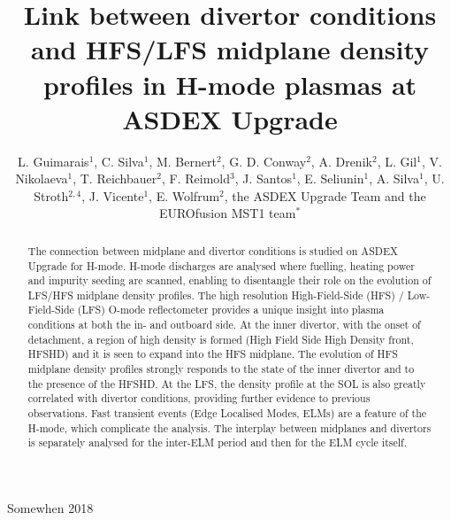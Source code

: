 \documentclass[12pt]{iopart}
\begin{document}
\title[Link between divertor conditions and HFS/LFS midplane density profiles in H-mode plasmas at ASDEX Upgrade]{Link between divertor conditions and HFS/LFS midplane density profiles in H-mode plasmas at ASDEX Upgrade}
\author{L. Guimarais$^1$, C. Silva$^1$, M. Bernert$^2$, G. D. Conway$^2$, A. Drenik$^2$, L. Gil$^1$, V. Nikolaeva$^{1}$, T. Reichbauer$^2$, F. Reimold$^3$, J. Santos$^1$, E. Seliunin$^1$, A. Silva$^1$, U. Stroth$^{2,4}$, J. Vicente$^1$, E. Wolfrum$^2$, the ASDEX Upgrade Team and the EUROfusion MST1 team$^*$}

\address{$^1$ Instituto de Plasmas e Fus\~ao Nuclear, Instituto Superior T\'ecnico, Universidade de Lisboa, Portugal}
\address{$^2$ Max-Planck-Institut f\"ur Plasmaphysik, Boltzmannstr. 2, 85748, Garching, Germany}
\address{$^3$ Forschungszentrum J\"ulich GmbH, Wilhelm-Johnen-Stra{\ss}e, 52425 J\"ulich, Germany}
\address{Physik-Department E28, Technische Universit\"at M\"unchen, James-Franck-Str. 1, 85748 Garching, Germany}
\begin{center}
\address{$^*$ 
See the author list of Meyer et al, Overview of progress in European Medium Sized Tokamaks towards an integrated plasma-edge/wall solution, accepted for publication in Nuclear Fusion}
\end{center}

\vspace{10pt}
\begin{indented}
\item[]Somewhen 2018
\end{indented}

\begin{abstract}
\label{sec:abstract}

The connection between midplane and divertor conditions is studied on ASDEX Upgrade for H-mode. H-mode discharges are analysed where fuelling, heating power and impurity seeding are scanned, enabling to disentangle their role on the evolution of LFS/HFS midplane density profiles. The high resolution High-Field-Side (HFS) / Low-Field-Side (LFS) O-mode reflectometer provides a unique insight into plasma conditions at both the in- and outboard side. At the inner divertor, with the onset of detachment, a region of high density is formed (High Field Side High Density front, HFSHD) and it is seen to expand into the HFS midplane. The evolution of HFS midplane density profiles strongly responds to the state of the inner divertor and to the presence of the HFSHD. At the LFS, the density profile at the SOL is also greatly correlated with divertor conditions, providing further evidence to previous observations. Fast transient events (Edge Localised Modes, ELMs) are a feature of the H-mode, which complicate the analysis. The interplay between midplanes and divertors is separately analysed for the inter-ELM period and then for the ELM cycle itself. 
\end{abstract}
\end{document}
